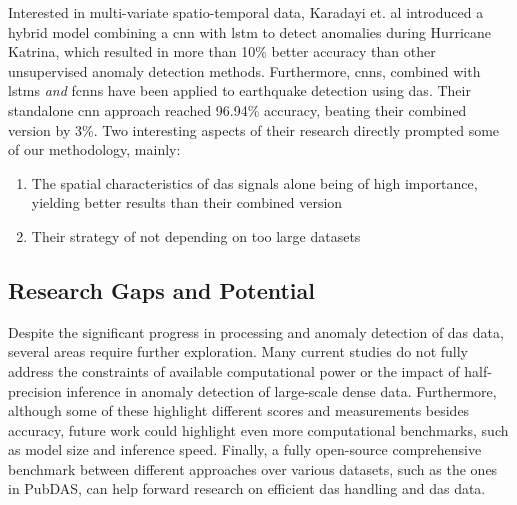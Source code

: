 Interested in multi-variate spatio-temporal data, Karadayi et. al \cite{hybriddlspatio} introduced a hybrid model 
 combining a \acrshort{cnn} with \acrshort{lstm} to detect anomalies during Hurricane Katrina, which resulted in more than 10\% better accuracy than other unsupervised anomaly detection methods. Furthermore, \acrshort{cnn}s, combined with \acrshort{lstm}s \textit{and} \acrshort{fcnn}s have been applied to earthquake detection using \acrshort{das}. Their standalone \acrshort{cnn} approach reached 96.94\% accuracy, beating their combined version by 3\%. Two interesting aspects of their research directly prompted some of our methodology, mainly:

\begin{enumerate}
    \item The spatial characteristics of \acrshort{das} signals alone being of high importance, yielding better results than their combined version
    \item Their strategy of not depending on too large datasets
\end{enumerate}


\subsection{Research Gaps and Potential}

Despite the significant progress in processing and anomaly detection of \acrshort{das} data, several areas require further exploration. Many current studies do not fully address the constraints of available computational power or the impact of half-precision inference in anomaly detection of large-scale dense data. Furthermore, although some of these highlight different scores and measurements besides accuracy, future work could highlight even more computational benchmarks, such as model size and inference speed. Finally, a fully open-source comprehensive benchmark between different approaches over various datasets, such as the ones in PubDAS, can help forward research on efficient \acrshort{das} handling and \acrshort{das} data.







